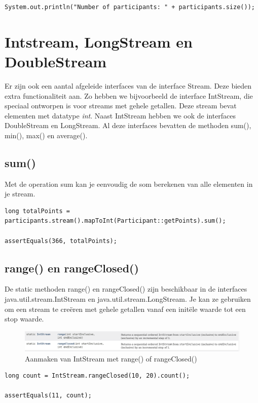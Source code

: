 \documentclass{tstextbook}
\begin{document}
\begin{lstlisting}
System.out.println("Number of participants: " + participants.size());
\end{lstlisting}
		
\section{Intstream, LongStream en DoubleStream}
	
Er zijn ook een aantal afgeleide interfaces van de interface Stream. Deze bieden extra functionaliteit aan. Zo hebben we bijvoorbeeld de interface IntStream, die speciaal ontworpen is voor streams met gehele getallen. Deze stream bevat elementen met datatype \textit{int}. Naast IntStream hebben we ook de interfaces DoubleStream en LongStream. Al deze interfaces bevatten de methoden sum(), min(), max() en average(). 

\subsection{sum()}

Met de operation sum kan je eenvoudig de som berekenen van alle elementen in je stream.

\begin{lstlisting}
long totalPoints = participants.stream().mapToInt(Participant::getPoints).sum();

assertEquals(366, totalPoints);
\end{lstlisting}
		

\subsection{range() en rangeClosed()}
		
De static methoden range() en rangeClosed() zijn beschikbaar in de interfaces java.util.stream.IntStream en java.util.stream.LongStream. Je kan ze gebruiken om een stream te cre\"eren met gehele getallen vanaf een init\"ele waarde tot een stop waarde.
\begin{figure}[H]
  \includegraphics[width=\linewidth]{images/h6/intstream_range.png}
  \caption{Aanmaken van IntStream met range() of rangeClosed()}
  \label{fig:stream_foreach}
\end{figure}

\begin{lstlisting}
long count = IntStream.rangeClosed(10, 20).count();

assertEquals(11, count);
\end{lstlisting}
\end{document}
